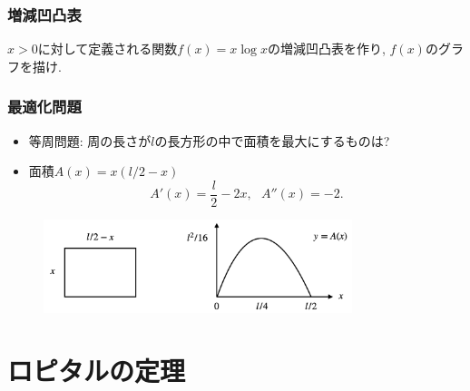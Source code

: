 


\begin{frame}
\frametitle{増減凹凸表}

\begin{Prob}
$x>0$に対して定義される関数$f(x)=x\log x$の増減凹凸表を作り, $f(x)$のグラフを描け. 
\end{Prob}

\vspace{5.5cm}

\end{frame}



\begin{frame}
\frametitle{最適化問題}   

\begin{itemize}
\item 等周問題: 周の長さが$l$の長方形の中で面積を最大にするものは? 
\item 面積$A(x)=x(l/2-x)$
$$
A'(x)=\frac{l}{2}-2x, \ \ \ A''(x)=-2. 
$$
\end{itemize}

 \begin{figure}[htbp]
 \begin{center} 
  \includegraphics[width=90mm]{calculus7/LecArea.png}
 \end{center}
\end{figure}

\end{frame}





\section{ロピタルの定理}

